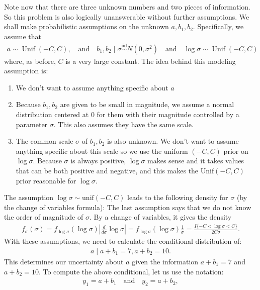 \documentclass{scrartcl}
\begin{document}
Note now that there are three unknown numbers and two pieces of
information. So this problem is also logically unanswerable without
further assumptions. We shall make probabilistic assumptions on the
unknown $a, b_1, b_2$. Specifically, we assume that 
\begin{align}\label{md3}
  a \sim \operatorname{Unif}(-C,C),  ~~~ \text{ and } ~~~  b_1,b_2\mid\sigma
  \overset{\mathrm{iid}}{\sim}N(0,\sigma^2) ~~~ \text{ and } ~~~
  \log\sigma \sim \operatorname{Unif}(-C,C)
\end{align}
where, as before, $C$ is a very large constant. The idea behind this
modeling assumption is:
\begin{enumerate}
\item We don't want to assume anything specific about $a$
\item Because $b_1, b_2$ are given to be small in magnitude, we assume
  a normal distribution centered at 0 for them with their magnitude
  controlled by a parameter $\sigma$. This also assumes they have the
  same scale.
\item The common scale $\sigma$ of $b_1, b_2$ is also unknown. We
  don't want to assume anything specific about this scale so we use
  the uniform $(-C, C)$ prior on $\log \sigma$. Because $\sigma$ is
  always positive, $\log \sigma$ makes sense and it takes values that
  can be both positive and negative, and this makes the
  $\text{Unif}(-C, C)$ prior reasonable for $\log \sigma$. 
\end{enumerate}
The assumption $\log \sigma \sim \text{unif}(-C, C)$ leads to the
following density for $\sigma$ (by the change of variables formula): 
The last assumption says that we do not know the order of magnitude of
$\sigma$. By a change of variables, it gives the density
\begin{align*}
  f_\sigma(\sigma)
  = f_{\log\sigma}(\log\sigma)
  \left|\frac{d}{d\sigma}\log\sigma\right| = f_{\log \sigma}(\log
  \sigma) \frac{1}{\sigma} = \frac{I\{-C < \log \sigma < C\}}{2 C
  \sigma}. 
\end{align*}
With these assumptions, we need to calculate the conditional
distribution of:
\begin{align*}
  a \mid a+ b_1 = 7, a + b_2 = 10. 
\end{align*}
This determines our uncertainty about $a$ given the information $a +
b_1 = 7$ and $a + b_2 = 10$. To compute the above conditional, let us
use the notation:
\begin{align*}
  y_1 = a + b_1 ~~~ \text{ and } ~~~ y_2 = a + b_2, 
\end{align*}
\end{document}
